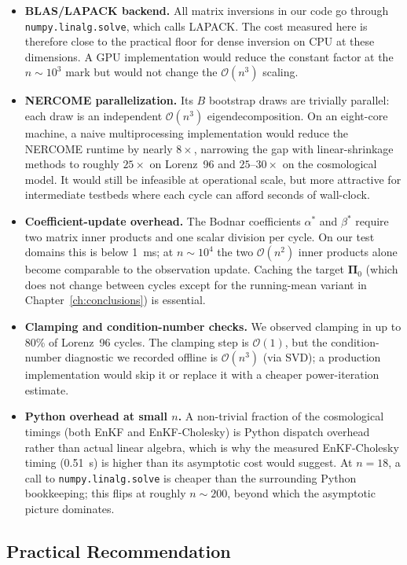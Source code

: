 \begin{itemize}
\item \textbf{BLAS/LAPACK backend.} All matrix inversions in our code go through \texttt{numpy.linalg.solve}, which calls LAPACK. The cost measured here is therefore close to the practical floor for dense inversion on CPU at these dimensions. A GPU implementation would reduce the constant factor at the $n \sim 10^3$ mark but would not change the $\mathcal{O}(n^3)$ scaling.
\item \textbf{NERCOME parallelization.} Its $B$ bootstrap draws are trivially parallel: each draw is an independent $\mathcal{O}(n^3)$ eigendecomposition. On an eight-core machine, a naive multiprocessing implementation would reduce the NERCOME runtime by nearly $8\times$, narrowing the gap with linear-shrinkage methods to roughly $25\times$ on Lorenz~96 and $25$--$30\times$ on the cosmological model. It would still be infeasible at operational scale, but more attractive for intermediate testbeds where each cycle can afford seconds of wall-clock.
\item \textbf{Coefficient-update overhead.} The Bodnar coefficients $\alpha^*$ and $\beta^*$ require two matrix inner products and one scalar division per cycle. On our test domains this is below 1~ms; at $n \sim 10^4$ the two $\mathcal{O}(n^2)$ inner products alone become comparable to the observation update. Caching the target $\boldsymbol{\Pi}_0$ (which does not change between cycles except for the running-mean variant in Chapter~\ref{ch:conclusions}) is essential.
\item \textbf{Clamping and condition-number checks.} We observed clamping in up to 80\% of Lorenz~96 cycles. The clamping step is $\mathcal{O}(1)$, but the condition-number diagnostic we recorded offline is $\mathcal{O}(n^3)$ (via SVD); a production implementation would skip it or replace it with a cheaper power-iteration estimate.
\item \textbf{Python overhead at small $n$.} A non-trivial fraction of the cosmological timings (both EnKF and EnKF-Cholesky) is Python dispatch overhead rather than actual linear algebra, which is why the measured EnKF-Cholesky timing (0.51~s) is higher than its asymptotic cost would suggest. At $n = 18$, a call to \texttt{numpy.linalg.solve} is cheaper than the surrounding Python bookkeeping; this flips at roughly $n \sim 200$, beyond which the asymptotic picture dominates.
\end{itemize}

\subsection{Practical Recommendation}
\label{sec:timing_recommendation}


